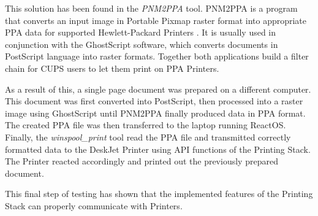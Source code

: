 This solution has been found in the \emph{PNM2PPA} tool.
PNM2PPA is a program that converts an input image in Portable Pixmap raster format into appropriate \gls{PPA} data for supported Hewlett-Packard Printers \cite{pnm2ppa2015}.
It is usually used in conjunction with the GhostScript software, which converts documents in PostScript language into raster formats.
Together both applications build a filter chain for \gls{CUPS} users to let them print on \gls{PPA} Printers.

As a result of this, a single page document was prepared on a different computer.
This document was first converted into PostScript, then processed into a raster image using GhostScript until PNM2PPA finally produced data in \gls{PPA} format.
The created \gls{PPA} file was then transferred to the laptop running ReactOS.
Finally, the \emph{winspool\_print} tool read the \gls{PPA} file and transmitted correctly formatted data to the DeskJet Printer using \gls{API} functions of the Printing Stack.
The Printer reacted accordingly and printed out the previously prepared document.

This final step of testing has shown that the implemented features of the Printing Stack can properly communicate with Printers.
